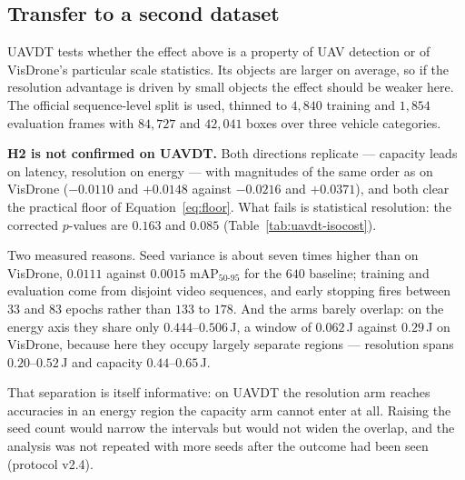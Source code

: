 \subsection{Transfer to a second dataset}
\label{sec:results:uavdt}

UAVDT tests whether the effect above is a property of UAV detection or of VisDrone's
particular scale statistics. Its objects are larger on average, so if the resolution
advantage is driven by small objects the effect should be weaker here. The official
sequence-level split is used, thinned to $4{,}840$ training and $1{,}854$ evaluation frames
with $84{,}727$ and $42{,}041$ boxes over three vehicle categories.

\textbf{H2 is not confirmed on UAVDT.} Both directions replicate --- capacity leads on latency,
resolution on energy --- with magnitudes of the same order as on VisDrone
($-0.0110$ and $+0.0148$ against $-0.0216$ and $+0.0371$), and both clear the practical
floor of Equation~\eqref{eq:floor}. What fails is statistical resolution: the corrected
$p$-values are $0.163$ and $0.085$ (Table~\ref{tab:uavdt-isocost}).

Two measured reasons. Seed variance is about seven times higher than on VisDrone, $0.0111$
against $0.0015$ mAP$_{50\text{-}95}$ for the $640$ baseline; training and evaluation come
from disjoint video sequences, and early stopping fires between $33$ and $83$ epochs rather
than $133$ to $178$. And the arms barely overlap: on the energy axis they share only
$0.444$--$0.506$\,J, a window of $0.062$\,J against $0.29$\,J on VisDrone, because here
they occupy largely separate regions --- resolution spans $0.20$--$0.52$\,J and capacity
$0.44$--$0.65$\,J.

That separation is itself informative: on UAVDT the resolution arm reaches accuracies in an
energy region the capacity arm cannot enter at all. Raising the seed count would narrow the
intervals but would not widen the overlap, and the analysis was not repeated with more
seeds after the outcome had been seen (protocol v2.4).

